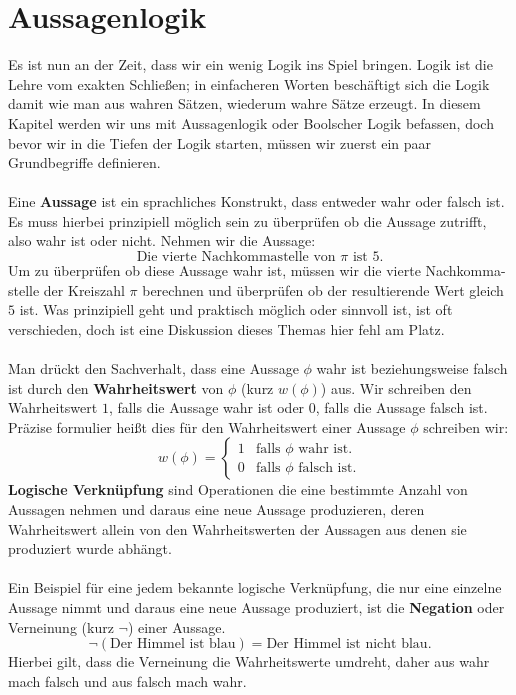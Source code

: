 \documentclass[11pt,a4paper,leqno]{report}
\numberwithin{equation}{chapter}
\begin{document}
\chapter{Aussagenlogik}
Es ist nun an der Zeit, dass wir ein wenig Logik ins Spiel bringen. Logik ist die Lehre vom exakten Schlie\ss{}en; in einfacheren Worten besch\"aftigt sich die Logik damit wie man aus wahren S\"atzen, wiederum wahre S\"atze erzeugt. In diesem Kapitel werden wir uns mit Aussagenlogik oder Boolscher Logik befassen, doch bevor wir in die Tiefen der Logik starten, m\"ussen wir zuerst ein paar Grundbegriffe definieren.\\
\\
Eine \textbf{Aussage} ist ein sprachliches Konstrukt, dass entweder wahr oder falsch ist. Es muss hierbei prinzipiell m\"oglich sein zu \"uberpr\"ufen ob die Aussage zutrifft, also wahr ist oder nicht. Nehmen wir die Aussage:
$$\text{Die vierte Nachkommastelle von }\pi\text{ ist $5$.}$$
Um zu \"uberpr\"ufen ob diese Aussage wahr ist, m\"ussen wir die vierte Nachkomma- stelle der Kreiszahl $\pi$ berechnen und \"uberpr\"ufen ob der resultierende Wert gleich $5$ ist. Was prinzipiell geht und praktisch m\"oglich oder sinnvoll ist, ist oft verschieden, doch ist eine Diskussion dieses Themas hier fehl am Platz.\\
\\ 
Man dr\"uckt den Sachverhalt, dass eine Aussage $\phi$ wahr ist beziehungsweise falsch ist durch den \textbf{Wahrheitswert} von $\phi$ (kurz $w(\phi)$) aus. Wir schreiben den Wahrheitswert $1$, falls die Aussage wahr ist oder $0$, falls die Aussage falsch ist. Pr\"azise formulier hei\ss{}t dies f\"ur den Wahrheitswert einer Aussage $\phi$ schreiben wir:
$$w(\phi)=
\begin{cases} 
	1 & \text{falls $\phi$ wahr ist.} \\
	0 & \text{falls $\phi$ falsch ist.} 
\end{cases}
$$
\textbf{Logische Verkn\"upfung} sind Operationen die eine bestimmte Anzahl von Aussagen nehmen und daraus eine neue Aussage produzieren, deren Wahrheitswert allein von den Wahrheitswerten der Aussagen aus denen sie produziert wurde abh\"angt.\\
\\
Ein Beispiel f\"ur eine jedem bekannte logische Verkn\"upfung, die nur eine einzelne Aussage nimmt und daraus eine neue Aussage produziert, ist die \textbf{Negation} oder Verneinung (kurz $\neg$) einer Aussage. 
$$\neg(\text{Der Himmel ist blau}) = \text{Der Himmel ist nicht blau.}$$
Hierbei gilt, dass die Verneinung die Wahrheitswerte umdreht, daher aus wahr mach falsch und aus falsch mach wahr.
\end{document}
